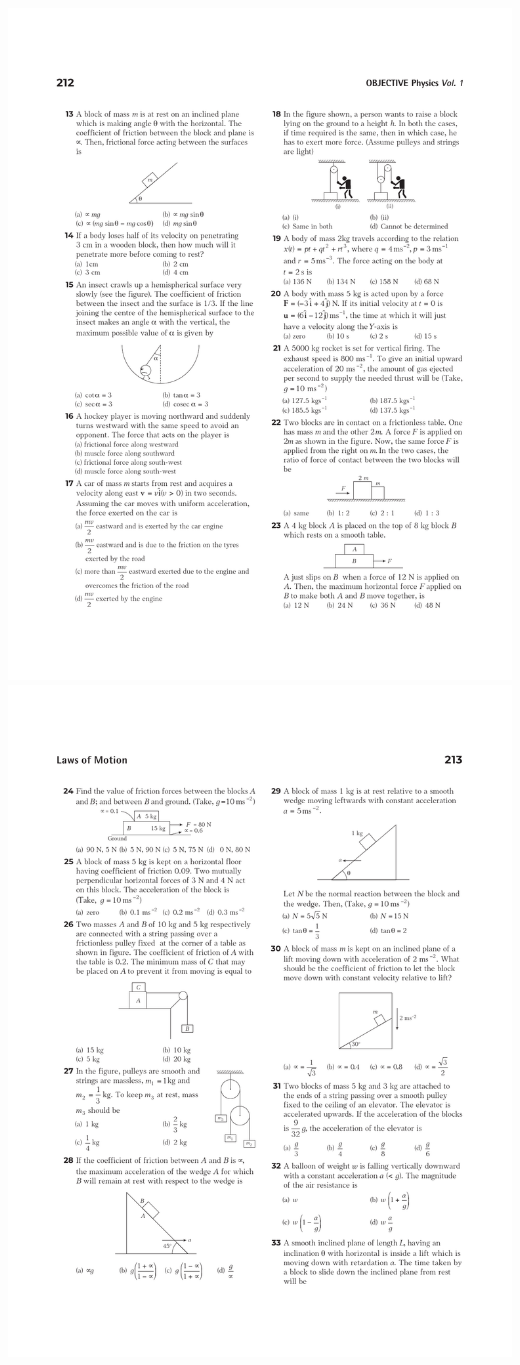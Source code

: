 \documentclass{article}
\begin{document}
\includegraphics[trim={2.5cm 0 2cm 0},clip, width=170 mm]{p13-23}
\linebreak
\includegraphics[trim={2.5cm 0 2cm 0},clip, width=170 mm]{p24-33}
\end{document}
